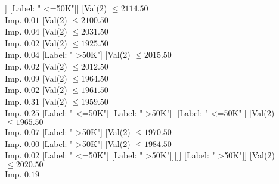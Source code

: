 \documentclass[margin=10pt]{standalone}
\begin{document}
\begin{forest}
																																								[Val($2$) $ \leq 1884.50$ \\ Imp. $0.17$
																																									[Val($2$) $ \leq 1862.50$ \\ Imp. $0.32$
																																										[Label: " <=50K"]
																																										[Label: " >50K"]]
																																									[Label: " <=50K"]]
																																								[Val($2$) $ \leq 2114.50$ \\ Imp. $0.01$
																																									[Val($2$) $ \leq 2100.50$ \\ Imp. $0.04$
																																										[Val($2$) $ \leq 2031.50$ \\ Imp. $0.02$
																																											[Val($2$) $ \leq 1925.50$ \\ Imp. $0.04$
																																												[Label: " >50K"]
																																												[Val($2$) $ \leq 2015.50$ \\ Imp. $0.02$
																																													[Val($2$) $ \leq 2012.50$ \\ Imp. $0.09$
																																														[Val($2$) $ \leq 1964.50$ \\ Imp. $0.02$
																																															[Val($2$) $ \leq 1961.50$ \\ Imp. $0.31$
																																																[Val($2$) $ \leq 1959.50$ \\ Imp. $0.25$
																																																	[Label: " <=50K"]
																																																	[Label: " >50K"]]
																																																[Label: " <=50K"]]
																																															[Val($2$) $ \leq 1965.50$ \\ Imp. $0.07$
																																																[Label: " >50K"]
																																																[Val($2$) $ \leq 1970.50$ \\ Imp. $0.00$
																																																	[Label: " >50K"]
																																																	[Val($2$) $ \leq 1984.50$ \\ Imp. $0.02$
																																																		[Label: " <=50K"]
																																																		[Label: " >50K"]]]]]
																																														[Label: " >50K"]]
																																													[Val($2$) $ \leq 2020.50$ \\ Imp. $0.19$

\end{forest}
\end{document}
